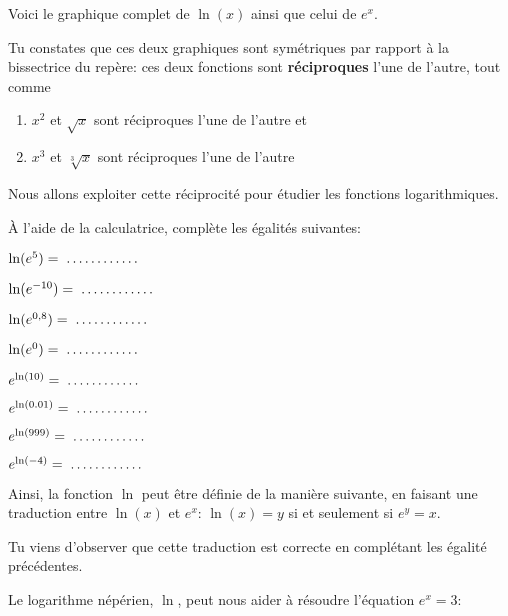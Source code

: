 \documentclass[a4paper,12pt,singlepage]{report}
\newcommand{\jdot}[1]{ \makebox[#1]{\dotfill}}
\begin{document}
Voici le graphique complet de \(\ln(x)\) ainsi que celui de \(e^x\).

\begin{center}

\end{center}

Tu constates que ces deux graphiques sont symétriques par rapport à la
bissectrice du repère: ces deux fonctions sont \textbf{réciproques} l'une de l'autre,
tout comme

\begin{enumerate}
\item \(x^2\) et \(\sqrt{x}\) sont réciproques l'une de l'autre et

\item \(x^3\) et \(\sqrt[3]{x}\) sont réciproques l'une de l'autre
\end{enumerate}

Nous allons exploiter cette réciprocité pour étudier les fonctions logarithmiques.

À l'aide de la calculatrice, complète les égalités suivantes:

\par \setlength{\columnseprule}{0 pt}
          \begin{minipage}[t]{\linewidth}
          \begin{multicols}{2}
\(\ln(e^5)=\jdot{2cm}\)

\(\ln(e^{-10})=\jdot{2cm}\)

\(\ln(e^{0,8})=\jdot{2cm}\)

\(\ln(e^{0})=\jdot{2cm}\)

\(e^{\ln(10)}=\jdot{2cm}\)

\(e^{\ln(0.01)}=\jdot{2cm}\)

\(e^{\ln(999)}=\jdot{2cm}\)

\(e^{\ln(-4)}=\jdot{2cm}\)


\end{multicols}\end{minipage}


Ainsi, la fonction \(\ln\) peut être définie de la manière suivante, en faisant
une traduction entre \(\ln(x)\) et \(e^x\): \(\ln(x)=y\) si et seulement si \(e^y=x\).


Tu viens d'observer que cette traduction est correcte en complétant les égalité
précédentes.

Le logarithme népérien, \(\ln\), peut nous aider à résoudre l'équation \(e^x=3\):

\vspace{3cm}
\end{document}
